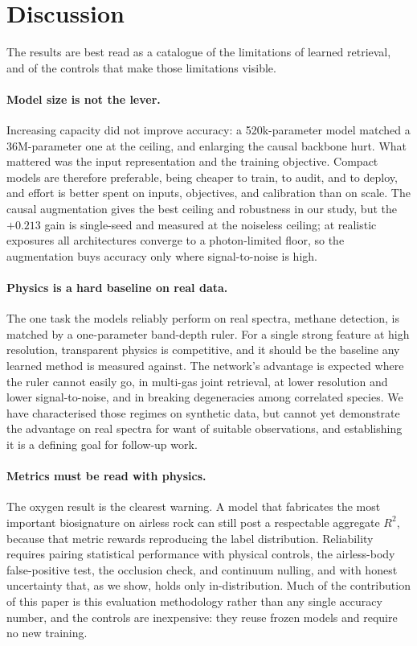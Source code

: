 \documentclass[11pt,twocolumn]{article}
\begin{document}
\section{Discussion}

The results are best read as a catalogue of the limitations of learned retrieval,
and of the controls that make those limitations visible.

\paragraph{Model size is not the lever.} Increasing capacity did not improve
accuracy: a 520k-parameter model matched a 36M-parameter one at the ceiling, and
enlarging the causal backbone hurt. What mattered was the input representation and
the training objective. Compact models are therefore preferable, being cheaper to
train, to audit, and to deploy, and effort is better spent on inputs, objectives,
and calibration than on scale. The causal augmentation gives the best ceiling and
robustness in our study, but the $+0.213$ gain is single-seed and measured at the
noiseless ceiling; at realistic exposures all architectures converge to a
photon-limited floor, so the augmentation buys accuracy only where signal-to-noise
is high.

\paragraph{Physics is a hard baseline on real data.} The one task the models
reliably perform on real spectra, methane detection, is matched by a
one-parameter band-depth ruler. For a single strong feature at high resolution,
transparent physics is competitive, and it should be the baseline any learned
method is measured against. The network's advantage is expected where the ruler
cannot easily go, in multi-gas joint retrieval, at lower resolution and lower
signal-to-noise, and in breaking degeneracies among correlated species. We have
characterised those regimes on synthetic data, but cannot yet demonstrate the
advantage on real spectra for want of suitable observations, and establishing it
is a defining goal for follow-up work.

\paragraph{Metrics must be read with physics.} The oxygen result is the clearest
warning. A model that fabricates the most important biosignature on airless rock
can still post a respectable aggregate $R^2$, because that metric rewards
reproducing the label distribution. Reliability requires pairing statistical
performance with physical controls, the airless-body false-positive test, the
occlusion check, and continuum nulling, and with honest uncertainty that, as we
show, holds only in-distribution. Much of the contribution of this paper is this
evaluation methodology rather than any single accuracy number, and the controls
are inexpensive: they reuse frozen models and require no new training.
\end{document}
